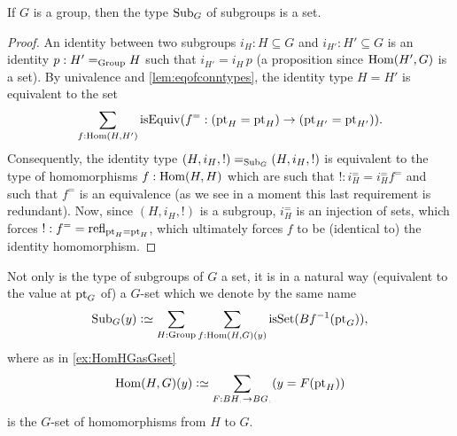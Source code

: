 \begin{lemma}
  \label{lem:setofsubgroups}
  If $G$ is a group, then the type $\mathrm{Sub}_G$ of subgroups is a set.
\end{lemma}
\begin{proof}
An identity between two subgroups $i_H:H\subseteq G$ and $i_{H'}:H'\subseteq G$ is an identity $p:H'=_{\mathrm{Group}}H$ such that $i_{H'}=i_H\,p$ (a proposition since $\Hom(H',G)$ is a set).
  By univalence and \cref{lem:eqofconntypes}, the identity type $H=H'$ is equivalent to the set 
$$\sum_{f:\Hom(H,H')}\isEq(f^=:(\pt_H=\pt_H)\to(\pt_{H'}=\pt_{H'})).$$  
Consequently, the identity type
$(H,i_H,!)=_{\mathrm{Sub}_G}(H,i_H,!)$ is equivalent to the type of homomorphisms $f:\Hom(H,H)$ which are such that $!:i_H^==i_H^=f^=$ and such that $f^=$ is an equivalence (as we see in a moment this last requirement is redundant).  
Now, since $(H,i_H,!)$ is a subgroup, $i_H^=$ is an injection of sets, which forces $!:f^==\refl{\pt_H=\pt_H}$, which ultimately forces $f$ to be (identical to) the identity homomorphism. 
\end{proof}
Not only is the type of subgroups  of $G$ a set, it is in a natural way (equivalent to the value at $\mathrm{pt}_G$ of) a $G$-set which we denote by the same name
$$%
\typesubgroup_G(y)\defequi \sum_{H:\typegroup}\sum_{f:\Hom(H,G)(y)}\isset(Bf^{-1}(\pt_G)),$$
where  as in \cref{ex:HomHGasGset}  
$$\Hom(H,G)(y)\defequi\sum_{F:BH_\div\to BG_\div}(y=F(\pt_H))$$
is the $G$-set of homomorphisms from $H$ to $G$.

